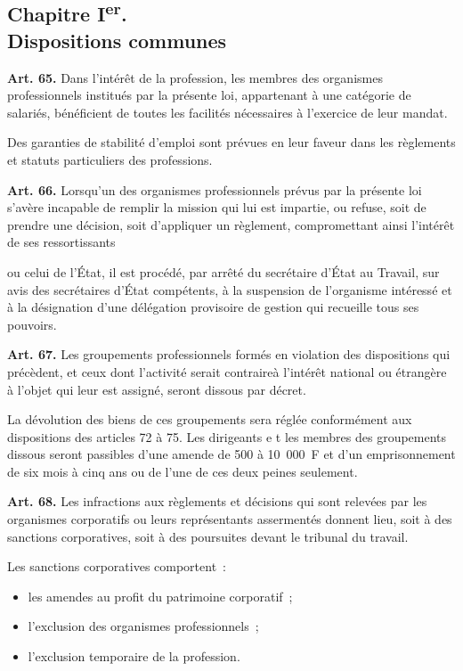 \documentclass[french,twoside]{book} %
\newcommand{\labelchar}[1]{\textbf{\color{rubric} #1}}
\begin{document}
\subsection[Chapitre Ier. Dispositions communes]{Chapitre I\textsuperscript{er}. \\
Dispositions communes}
\noindent \labelchar{Art. 65.} Dans l’intérêt de la profession, les membres des organismes professionnels institués par la présente loi, appartenant à une catégorie de salariés, bénéficient de toutes les facilités nécessaires à l’exercice de leur mandat.\par
Des garanties de stabilité d’emploi sont prévues en leur faveur dans les règlements et statuts particuliers des professions.\par
\bigbreak
\noindent \labelchar{Art. 66.} Lorsqu’un des organismes professionnels prévus par la présente loi s’avère incapable de remplir la mission qui lui est impartie, ou refuse, soit de prendre une décision, soit d’appliquer un règlement, compromettant ainsi l’intérêt de ses ressortissants\par
ou celui de l’État, il est procédé, par arrêté du secrétaire d’État au Travail, sur avis des secrétaires d’État compétents, à la suspension de l’organisme intéressé et à la désignation d’une délégation provisoire de gestion qui recueille tous ses pouvoirs.\par
\bigbreak
\noindent \labelchar{Art. 67.} Les groupements professionnels formés en violation des dispositions qui précèdent, et ceux dont l’activité serait contraireà l’intérêt national ou étrangère à l’objet qui leur est assigné, seront dissous par décret.\par
La dévolution des biens de ces groupements sera réglée conformément aux dispositions des articles 72 à 75. Les dirigeants e t les membres des groupements dissous seront passibles d’une amende de 500 à 10 000 F et d’un emprisonnement de six mois à cinq ans ou de l’une de ces deux peines seulement.\par
\bigbreak
\noindent \labelchar{Art. 68.} Les infractions aux règlements et décisions qui sont relevées par les organismes corporatifs ou leurs représentants assermentés donnent lieu, soit à des sanctions corporatives, soit à des poursuites devant le tribunal du travail.\par
Les sanctions corporatives comportent :\par

\begin{itemize}[itemsep=0pt,]
\item les amendes au profit du patrimoine corporatif ;
\item l’exclusion des organismes professionnels ;
\item l’exclusion temporaire de la profession.
\end{itemize}
\end{document}
